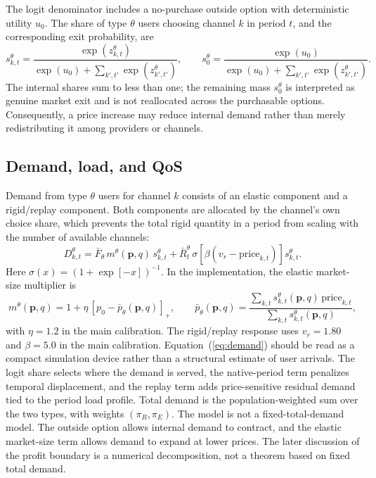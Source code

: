 \documentclass[11pt,a4paper]{article}
\newcommand{\D}{D}
\newcommand{\p}{\boldsymbol{p}}
\begin{document}
The logit denominator includes a no-purchase outside option with deterministic utility $u_0$. The share of type $\theta$ users choosing channel $k$ in period $t$, and the corresponding exit probability, are
\begin{equation}
  s^\theta_{k,t}=\frac{\exp(z^\theta_{k,t})}{\exp(u_0)+\sum_{k',t'}\exp(z^\theta_{k',t'})},
  \qquad
  s^\theta_0=\frac{\exp(u_0)}{\exp(u_0)+\sum_{k',t'}\exp(z^\theta_{k',t'})}.
  \label{eq:share}
\end{equation}
The internal shares sum to less than one; the remaining mass $s^\theta_0$ is interpreted as genuine market exit and is not reallocated across the purchasable options. Consequently, a price increase may reduce internal demand rather than merely redistributing it among providers or channels.

\subsection{Demand, load, and QoS}

Demand from type $\theta$ users for channel $k$ consists of an elastic component and a rigid/replay component. Both components are allocated by the channel's own choice share, which prevents the total rigid quantity in a period from scaling with the number of available channels:
\begin{equation}
  \D^\theta_{k,t}=\bar F_\theta\,m^\theta(\p,q)\,s^\theta_{k,t}
  +\bar R^\theta_t\,\sigma[\beta(v_r-\text{price}_{k,t})]s^\theta_{k,t}.
  \label{eq:demand}
\end{equation}
Here $\sigma(x)=(1+\exp[-x])^{-1}$. In the implementation, the elastic market-size multiplier is
\begin{equation}
  m^\theta(\p,q)
  =
  1+\eta\,[p_0-\bar p_\theta(\p,q)]_+,
  \qquad
  \bar p_\theta(\p,q)
  =
  \frac{\sum_{k,t}s^\theta_{k,t}(\p,q)\,\text{price}_{k,t}}
       {\sum_{k,t}s^\theta_{k,t}(\p,q)} ,
  \label{eq:market_size}
\end{equation}
with $\eta=1.2$ in the main calibration. The rigid/replay response uses $v_r=1.80$ and $\beta=5.0$ in the main calibration. Equation~(\ref{eq:demand}) should be read as a compact simulation device rather than a structural estimate of user arrivals. The logit share selects where the demand is served, the native-period term penalizes temporal displacement, and the replay term adds price-sensitive residual demand tied to the period load profile. Total demand is the population-weighted sum over the two types, with weights $(\pi_R,\pi_E)$. The model is not a fixed-total-demand model. The outside option allows internal demand to contract, and the elastic market-size term allows demand to expand at lower prices. The later discussion of the profit boundary is a numerical decomposition, not a theorem based on fixed total demand.
\end{document}
